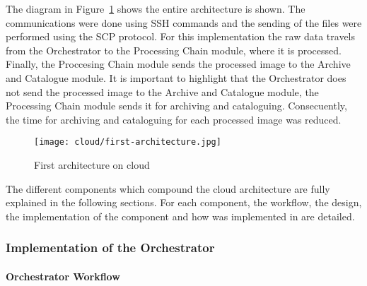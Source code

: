 The diagram in Figure~\ref{fig:first-architecture} shows the entire architecture is shown. The
communications were done using \ac{SSH} commands and the sending of the files were
performed using the \ac{SCP} protocol. For this implementation the raw data
travels from the Orchestrator to the Processing Chain module, where it is
processed. Finally, the Proccesing Chain module sends the processed image to the
Archive and
Catalogue module. It is important to highlight that the
Orchestrator does not send the processed image to the Archive and Catalogue
module, the Processing Chain module sends it for archiving and cataloguing. Consecuently, the time for
archiving and cataloguing for each processed image was reduced.

\begin{figure}[!h]
\begin{center}
\texttt{[image: cloud/first-architecture.jpg]}
\caption{First architecture on cloud}
\label{fig:first-architecture}
\end{center}
\end{figure}

The different components which compound the cloud architecture are fully
explained in the following sections. For each component, the  workflow, the
design, the implementation of the component and how was implemented in \bonfire are detailed.

\subsubsection{Implementation of the Orchestrator}

\paragraph{Orchestrator Workflow}~\\

